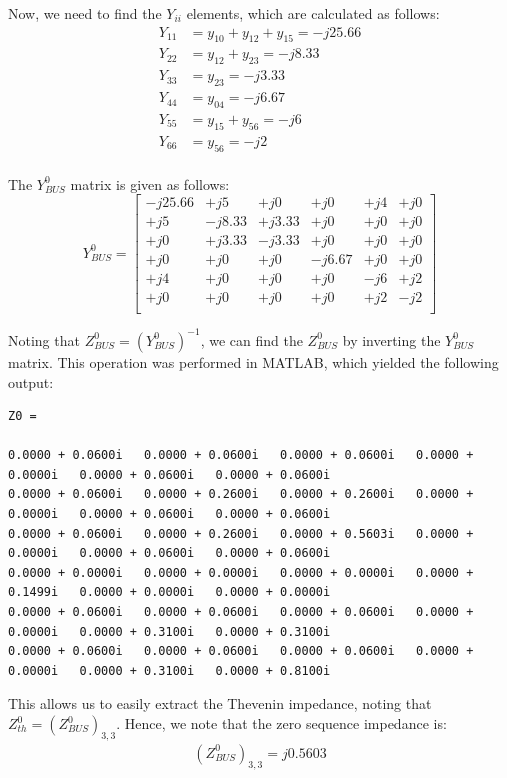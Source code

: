 \documentclass{article}
\begin{document}
Now, we need to find the $Y_{ii}$ elements, which are calculated as follows:
\begin{align*}
	Y_{11} &= y_{10} + y_{12} + y_{15} = -j25.66\\
	Y_{22} &= y_{12} + y_{23} = -j8.33\\
	Y_{33} &= y_{23} = -j3.33\\
	Y_{44} &= y_{04} = -j6.67\\
	Y_{55} &= y_{15} + y_{56} = -j6\\
	Y_{66} &= y_{56} = -j2\\
\end{align*}

The $Y^0_{BUS}$ matrix is given as follows:
\hspace{-1cm}
\[
Y^0_{BUS} = 
\begin{bmatrix}
-j25.66 &  +j5 &  +j0 &  +j0 &  +j4 &  +j0\\
+j5 &  -j8.33 &  +j3.33 &  +j0 &  +j0 &  +j0\\
+j0 &  +j3.33 &  -j3.33 &  +j0 &  +j0 &  +j0\\
+j0 &  +j0 &  +j0 &  -j6.67 &  +j0 &  +j0\\
+j4 &  +j0 &  +j0 &  +j0 &  -j6 &  +j2\\
+j0 &  +j0 &  +j0 &  +j0 &  +j2 &  -j2\\
\end{bmatrix}
\]

Noting that $Z^0_{BUS} = (Y^0_{BUS})^{-1}$, we can find the $Z^0_{BUS}$ by inverting the $Y^0_{BUS}$ matrix. This operation was performed in MATLAB, which yielded the following output:
{\footnotesize
\begin{verbatim}
Z0 =

0.0000 + 0.0600i   0.0000 + 0.0600i   0.0000 + 0.0600i   0.0000 + 0.0000i   0.0000 + 0.0600i   0.0000 + 0.0600i
0.0000 + 0.0600i   0.0000 + 0.2600i   0.0000 + 0.2600i   0.0000 + 0.0000i   0.0000 + 0.0600i   0.0000 + 0.0600i
0.0000 + 0.0600i   0.0000 + 0.2600i   0.0000 + 0.5603i   0.0000 + 0.0000i   0.0000 + 0.0600i   0.0000 + 0.0600i
0.0000 + 0.0000i   0.0000 + 0.0000i   0.0000 + 0.0000i   0.0000 + 0.1499i   0.0000 + 0.0000i   0.0000 + 0.0000i
0.0000 + 0.0600i   0.0000 + 0.0600i   0.0000 + 0.0600i   0.0000 + 0.0000i   0.0000 + 0.3100i   0.0000 + 0.3100i
0.0000 + 0.0600i   0.0000 + 0.0600i   0.0000 + 0.0600i   0.0000 + 0.0000i   0.0000 + 0.3100i   0.0000 + 0.8100i
\end{verbatim}
}

This allows us to easily extract the Thevenin impedance, noting that $Z^0_{th} = (Z^0_{BUS})_{3,3}$. Hence, we note that the zero sequence impedance is:
\begin{align*}
	(Z^0_{BUS})_{3,3} = j0.5603
\end{align*}
\end{document}
